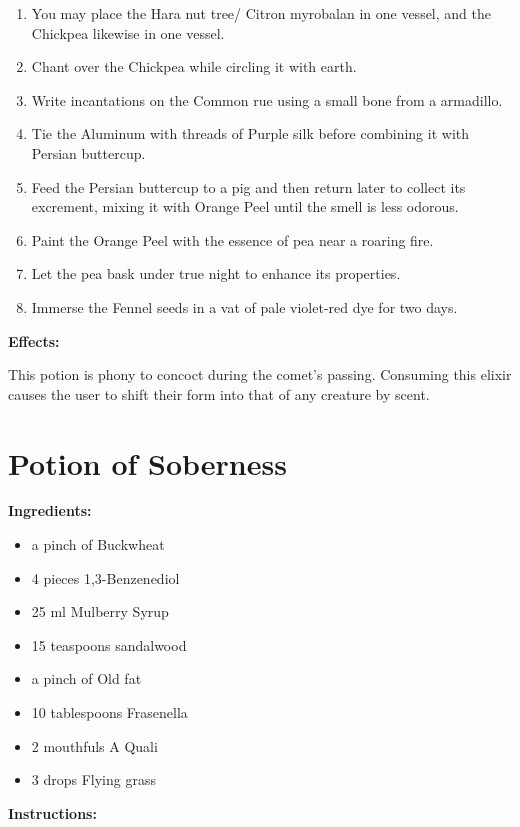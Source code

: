\documentclass{article}
\begin{document}
\begin{enumerate}
  \item You may place the Hara nut tree/ Citron myrobalan in one vessel, and the Chickpea likewise in one vessel.
  \item Chant over the Chickpea while circling it with earth.
  \item Write incantations on the Common rue using a small bone from a armadillo.
  \item Tie the Aluminum with threads of Purple silk before combining it with Persian buttercup.
  \item Feed the Persian buttercup to a pig and then return later to collect its excrement, mixing it with Orange Peel until the smell is less odorous.
  \item Paint the Orange Peel with the essence of pea near a roaring fire.
  \item Let the pea bask under true night to enhance its properties.
  \item Immerse the Fennel seeds in a vat of pale violet-red dye for two days.
\end{enumerate}

\textbf{Effects:}

This potion is phony to concoct during the comet’s passing. Consuming this elixir causes the user to shift their form into that of any creature by scent.

\newpage
\section*{Potion of Soberness}

\textbf{Ingredients:}

\begin{itemize}
  \item a pinch of Buckwheat
  \item 4 pieces 1,3-Benzenediol
  \item 25 ml Mulberry Syrup
  \item 15 teaspoons sandalwood
  \item a pinch of Old fat
  \item 10 tablespoons Frasenella
  \item 2 mouthfuls A Quali
  \item 3 drops Flying grass
\end{itemize}

\textbf{Instructions:}
\end{document}
